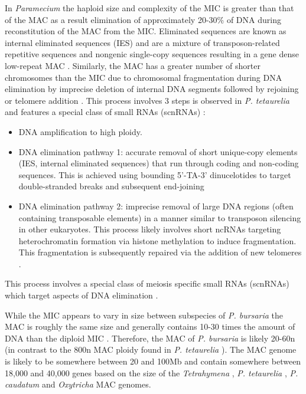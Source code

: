In \textit{Paramecium} the haploid size and complexity of the MIC is greater than that of the MAC as a result elimination 
of approximately 20-30\% of DNA during reconstitution of the MAC from the MIC.  
Eliminated sequences are known as internal eliminated sequences (IES) and are a mixture of 
transposon-related repetitive sequences and nongenic single-copy sequences resulting in a gene dense low-repeat MAC \citep{Kiefer2013}.   
Similarly, the MAC has a greater number of shorter chromosomes than the MIC due to chromosomal fragmentation during DNA elimination by imprecise
deletion of internal DNA segments followed by rejoining or telomere addition \citep{Kiefer2013}.
This process involves 3 steps is observed in \textit{P. tetaurelia} and features
a special class of small RNAs (scnRNAs) \citep{Kiefer2013}:
\begin{itemize}
    \item DNA amplification to high ploidy.
    \item DNA elimination pathway 1: accurate removal of short unique-copy elements (IES, internal eliminated sequences) that run through coding and non-coding sequences. This is achieved using bounding 5'-TA-3' dinucelotides to target double-stranded breaks and subsequent end-joining \citep{Mayer1999,Betermier2004}
    \item DNA elimination pathway 2: imprecise removal of large DNA regions (often containing transposable elements) in a manner similar
        to transposon silencing in other eukaryotes.  This process likely involves short ncRNAs targeting heterochromatin formation via histone methylation to induce fragmentation.  This fragmentation is subsequently repaired via the addition of new telomeres \citep{Duret2008}.
\end{itemize}
This process involves a special class of meiosis specific small RNAs (scnRNAs) which target aspects of DNA elimination \citep{Kiefer2013}.


While the MIC appears to vary in size between subspecies of \textit{P. bursaria} the MAC is roughly the same
size and generally contains 10-30 times the amount of DNA than the diploid MIC \citep{Cullis1972}.  
Therefore, the MAC of \textit{P. bursaria} is likely 20-60n (in contrast to the 800n MAC ploidy found in \textit{P. tetaurelia} \citep{Duret2008}).
The MAC genome is likely to be somewhere between 20 and 100Mb and contain somewhere between 
18,000 and 40,000 genes based on the size of the \textit{Tetrahymena} \citep{Eisen2006}, 
\textit{P. tetaurelia} \citep{Aury2006}, \textit{P. caudatum} \citep{McGrath2014} and \textit{Oxytricha} \citep{Swart2013} MAC genomes.

